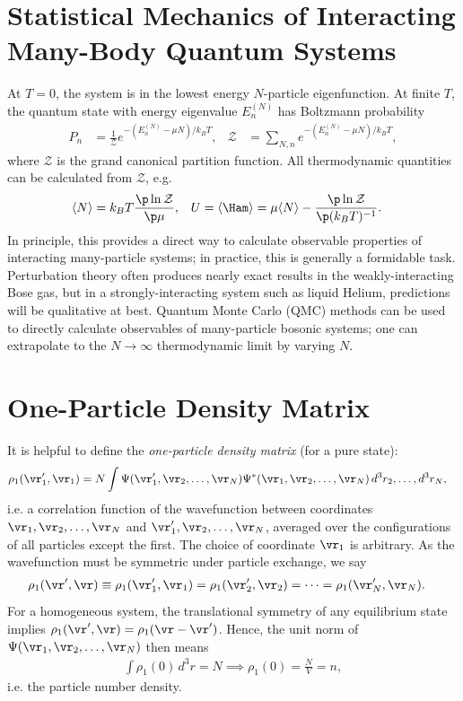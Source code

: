 \documentclass[a4paper, 11pt, normalem]{report}
\begin{document}
\section{Statistical Mechanics of Interacting Many-Body Quantum Systems}
At $T=0$, the system is in the lowest energy $N$-particle eigenfunction.
At finite $T$, the quantum state with energy eigenvalue $E_n^{(N)}$ has Boltzmann probability
\begin{align}
    P_n &= \frac{1}{\mathcal{Z}}e^{-(E_n^{(N)}-\mu N)/k_BT}, & \mathcal{Z} &= \sum_{N,n}e^{-(E_n^{(N)}-\mu N)/k_BT},
\end{align}
where $\mathcal{Z}$ is the grand canonical partition function.
All thermodynamic quantities can be calculated from $\mathcal{Z}$, e.g.
\begin{align}
    \langle N\rangle &= k_BT\frac{\p\ln\mathcal{Z}}{\p\mu}, & U &= \langle\Ham\rangle = \mu\langle N\rangle - \frac{\p\ln\mathcal{Z}}{\p(k_BT)^{-1}}.
\end{align}
In principle, this provides a direct way to calculate observable properties of interacting many-particle systems; in practice, this is generally a formidable task.
Perturbation theory often produces nearly exact results in the weakly-interacting Bose gas, but in a strongly-interacting system such as liquid Helium, predictions will be qualitative at best.
Quantum Monte Carlo (QMC) methods can be used to directly calculate observables of many-particle bosonic systems; one can extrapolate to the $N\to\infty$ thermodynamic limit by varying $N$.

\section{One-Particle Density Matrix}
It is helpful to define the \emph{one-particle density matrix} (for a pure state):
\begin{align}
    \rho_1(\vr_1',\vr_1) &= N\int \Psi(\vr_1',\vr_2,\dots,\vr_N)\Psi^*(\vr_1,\vr_2,\dots,\vr_N)\,d^3r_2,\dots,d^3r_N,
\end{align}
i.e. a correlation function of the wavefunction between coordinates $\vr_1,\vr_2,\dots,\vr_N$ and $\vr_1',\vr_2,\dots,\vr_N$, averaged over the configurations of all particles except the first.
The choice of coordinate $\vr_1$ is arbitrary.
As the wavefunction must be symmetric under particle exchange, we say
\begin{align}
    \rho_1(\vr',\vr) &\equiv \rho_1(\vr_1',\vr_1) = \rho_1(\vr_2',\vr_2) = \cdots = \rho_1(\vr_N',\vr_N).
\end{align}
For a homogeneous system, the translational symmetry of any equilibrium state implies $\rho_1(\vr',\vr)=\rho_1(\vr-\vr')$.
Hence, the unit norm of $\Psi(\vr_1,\vr_2,\dots,\vr_N)$ then means
\begin{align}
    \int \rho_1(0)\,d^3r = N \implies \rho_1(0) = \frac{N}{V} = n,
\end{align}
i.e. the particle number density.
\end{document}
